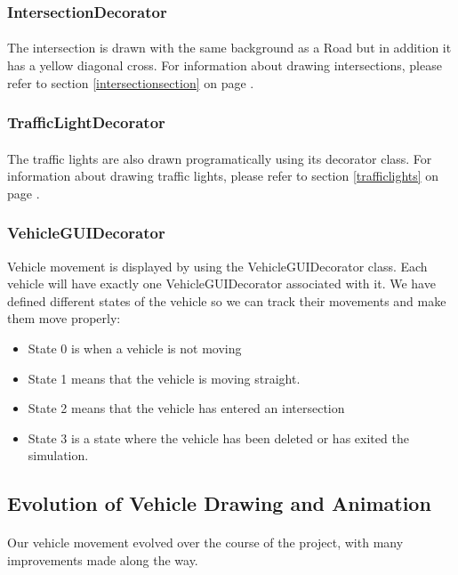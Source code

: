 \documentclass[a4paper,11pt,titlepage]{article}
\begin{document}
\subsubsection{IntersectionDecorator}
\paragraph{}
The intersection is drawn with the same background as a Road but in addition it has a yellow diagonal cross. For information about drawing intersections, please refer to section \ref{intersectionsection} on page \pageref{intersectionsection}.
\subsubsection{TrafficLightDecorator}
\paragraph{}
The traffic lights are also drawn programatically using its decorator class. For information about drawing traffic lights, please refer to section \ref{trafficlights} on page \pageref{trafficlights}.
\subsubsection{VehicleGUIDecorator}
Vehicle movement is displayed by using the VehicleGUIDecorator class. 
Each vehicle will have exactly one VehicleGUIDecorator associated with it. We have defined different states of the vehicle so we can track their movements and make them move properly:
\begin{itemize}\itemsep1pt \parskip0pt 
\item State 0 is when a vehicle is not moving
\item State 1 means that the vehicle is moving straight.
\item State 2 means that the vehicle has entered an intersection
\item State 3 is a state where the vehicle has been deleted or has exited the simulation.
\end{itemize} 

\subsection{Evolution of Vehicle Drawing and Animation}
\paragraph{}
Our vehicle movement evolved over the course of the project, with many improvements made along the way. 
\end{document}
